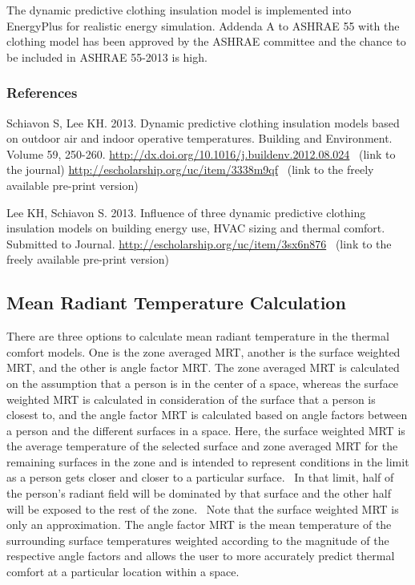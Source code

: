 The dynamic predictive clothing insulation model is implemented into EnergyPlus for realistic energy simulation. Addenda A to ASHRAE 55 with the clothing model has been approved by the ASHRAE committee and the chance to be included in ASHRAE 55-2013 is high.

\subsubsection{References}\label{references-033}

Schiavon S, Lee KH. 2013. Dynamic predictive clothing insulation models based on outdoor air and indoor operative temperatures. Building and Environment. Volume 59, 250-260. \url{http://dx.doi.org/10.1016/j.buildenv.2012.08.024} ~(link to the journal) \url{http://escholarship.org/uc/item/3338m9qf} ~(link to the freely available pre-print version)

Lee KH, Schiavon S. 2013. Influence of three dynamic predictive clothing insulation models on building energy use, HVAC sizing and thermal comfort. Submitted to Journal. \url{http://escholarship.org/uc/item/3sx6n876}~ (link to the freely available pre-print version)

\subsection{Mean Radiant Temperature Calculation}\label{mean-radiant-temperature-calculation}

There are three options to calculate mean radiant temperature in the thermal comfort models. One is the zone averaged MRT, another is the surface weighted MRT, and the other is angle factor MRT. The zone averaged MRT is calculated on the assumption that a person is in the center of a space, whereas the surface weighted MRT is calculated in consideration of the surface that a person is closest to, and the angle factor MRT is calculated based on angle factors between a person and the different surfaces in a space. Here, the surface weighted MRT is the average temperature of the selected surface and zone averaged MRT for the remaining surfaces in the zone and is intended to represent conditions in the limit as a person gets closer and closer to a particular surface.~ In that limit, half of the person's radiant field will be dominated by that surface and the other half will be exposed to the rest of the zone.~ Note that the surface weighted MRT is only an approximation. The angle factor MRT is the mean temperature of the surrounding surface temperatures weighted according to the magnitude of the respective angle factors and allows the user to more accurately predict thermal comfort at a particular location within a space.

